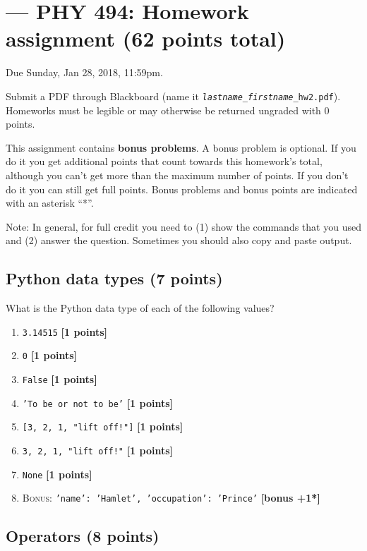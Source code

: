 \documentclass[letterpaper]{scrartcl}
\newcommand{\anumber}{2}
\newcommand{\BONUS}{\textsc{Bonus: }}
\newcommand{\bonus}[1]{\textbf{[bonus +#1*]}}
\newcommand{\points}[1]{\textbf{[#1 points]}}
\newenvironment{enuma}{\begin{enumerate}[label=(\alph*)]}{\end{enumerate}}
\newcommand{\python}[1]{\texttt{#1}}
\begin{document}

\setcounter{section}{\anumber}
\addtocounter{section}{-1}
\section{ --- PHY 494: Homework assignment (62 points total)}

\noindent Due Sunday, Jan 28, 2018, 11:59pm.

\noindent Submit a PDF through Blackboard (name it
\texttt{\emph{lastname}\_\emph{firstname}\_hw\anumber.pdf}).
Homeworks must be legible or may otherwise be returned ungraded with 0
points.

This assignment contains \textbf{bonus problems}. A bonus problem is
optional. If you do it you get additional points that count towards
this homework's total, although you can't get more than the maximum
number of points. If you don't do it you can still get full
points. Bonus problems and bonus points are indicated with an asterisk
``*''.

Note: In general, for full credit you need to (1) show the commands
that you used and (2) answer the question. Sometimes you should also
copy and paste output.

\subsection{Python data types (7 points)}
What is the Python data type of each of the following values?
\begin{enuma}
\item \python{3.14515} \points{1}
\item \python{0} \points{1}
\item \python{False} \points{1}
\item \python{'To be or not to be'} \points{1}
\item \python{[3, 2, 1, "lift off!"]} \points{1}
\item \python{3, 2, 1, "lift off!"} \points{1}
\item \python{None} \points{1}
\item \BONUS \python{{'name': 'Hamlet', 'occupation': 'Prince'}} \bonus{1}
\end{enuma}

\subsection{Operators (8 points)}
\end{document}
